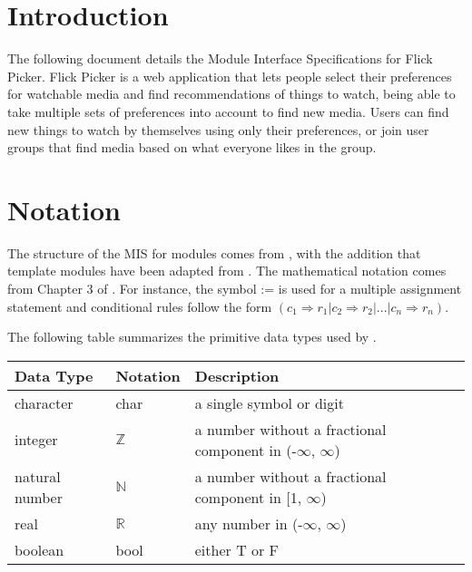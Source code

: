 \documentclass[12pt, titlepage]{article}
\begin{document}
\newpage

\tableofcontents

\newpage


\section{Introduction}

The following document details the Module Interface Specifications for Flick Picker. Flick Picker is a web application that lets people select their preferences for watchable media and find recommendations of things to watch, being able to take multiple sets of preferences into account to find new media. Users can find new things to watch by themselves using only their preferences, or join user groups that find media based on what everyone likes in the group.

\section{Notation}


The structure of the MIS for modules comes from \citet{HoffmanAndStrooper1995},
with the addition that template modules have been adapted from
\cite{GhezziEtAl2003}.  The mathematical notation comes from Chapter 3 of
\citet{HoffmanAndStrooper1995}.  For instance, the symbol := is used for a
multiple assignment statement and conditional rules follow the form $(c_1
\Rightarrow r_1 | c_2 \Rightarrow r_2 | ... | c_n \Rightarrow r_n )$.

The following table summarizes the primitive data types used by \progname. 

\begin{center}
\renewcommand{\arraystretch}{1.2}
\noindent 
\begin{tabular}{l l p{7.5cm}} 
\toprule 
\textbf{Data Type} & \textbf{Notation} & \textbf{Description}\\ 
\midrule
character & char & a single symbol or digit\\
integer & $\mathbb{Z}$ & a number without a fractional component in (-$\infty$, $\infty$) \\
natural number & $\mathbb{N}$ & a number without a fractional component in [1, $\infty$) \\
real & $\mathbb{R}$ & any number in (-$\infty$, $\infty$)\\
boolean & bool & either T or F \\
\bottomrule
\end{tabular}
\end{center}
\end{document}
